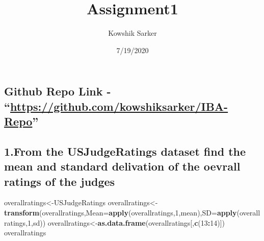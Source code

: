 \documentclass[
]{article}
\title{Assignment1}
\author{Kowshik Sarker}
\date{7/19/2020}
\newenvironment{Shaded}{\begin{snugshade}}{\end{snugshade}}
\newcommand{\DataTypeTok}[1]{\textcolor[rgb]{0.13,0.29,0.53}{#1}}
\newcommand{\DecValTok}[1]{\textcolor[rgb]{0.00,0.00,0.81}{#1}}
\newcommand{\KeywordTok}[1]{\textcolor[rgb]{0.13,0.29,0.53}{\textbf{#1}}}
\newcommand{\NormalTok}[1]{#1}
\newcommand{\OperatorTok}[1]{\textcolor[rgb]{0.81,0.36,0.00}{\textbf{#1}}}
\begin{document}
\maketitle

\hypertarget{github-repo-link---httpsgithub.comkowshiksarkeriba-repo}{%
\subsection{\texorpdfstring{Github Repo Link -
``\url{https://github.com/kowshiksarker/IBA-Repo}''}{Github Repo Link - ``https://github.com/kowshiksarker/IBA-Repo''}}\label{github-repo-link---httpsgithub.comkowshiksarkeriba-repo}}

\hypertarget{from-the-usjudgeratings-dataset-find-the-mean-and-standard-delivation-of-the-oevrall-ratings-of-the-judges}{%
\subsection{1.From the USJudgeRatings dataset find the mean and standard
delivation of the oevrall ratings of the
judges}\label{from-the-usjudgeratings-dataset-find-the-mean-and-standard-delivation-of-the-oevrall-ratings-of-the-judges}}

\begin{Shaded}
\begin{Highlighting}[]
\NormalTok{overallratings<-USJudgeRatings}
\NormalTok{overallratings<-}\KeywordTok{transform}\NormalTok{(overallratings,}\DataTypeTok{Mean=}\KeywordTok{apply}\NormalTok{(overallratings,}\DecValTok{1}\NormalTok{,mean),}\DataTypeTok{SD=}\KeywordTok{apply}\NormalTok{(overallratings,}\DecValTok{1}\NormalTok{,sd))}
\NormalTok{overallratings<-}\KeywordTok{as.data.frame}\NormalTok{(overallratings[,}\KeywordTok{c}\NormalTok{(}\DecValTok{13}\OperatorTok{:}\DecValTok{14}\NormalTok{)])}
\NormalTok{overallratings}
\end{Highlighting}
\end{Shaded}
\end{document}
